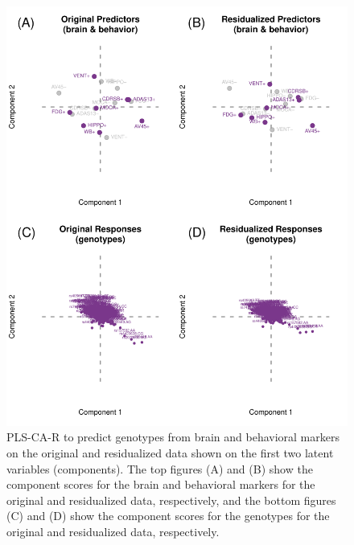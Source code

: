 \documentclass[12pt]{article}
\begin{document}
\begin{figure}[!hbtp]

{\centering \includegraphics[width=.8\textwidth,height=.8\textheight]{PLSCAR_to_a_GPLS_files/figure-latex/unnamed-chunk-10-1} 

}

\caption{\label{fig:original_residualized_ex2} PLS-CA-R to predict genotypes from brain and behavioral markers on the original and residualized data shown on the first two latent variables (components). The top figures (A) and (B) show the component scores for the brain and behavioral markers for the original and residualized data, respectively, and the bottom figures (C) and (D) show the component scores for the genotypes for the original and residualized data, respectively.}\label{fig:unnamed-chunk-10}
\end{figure}
\end{document}
